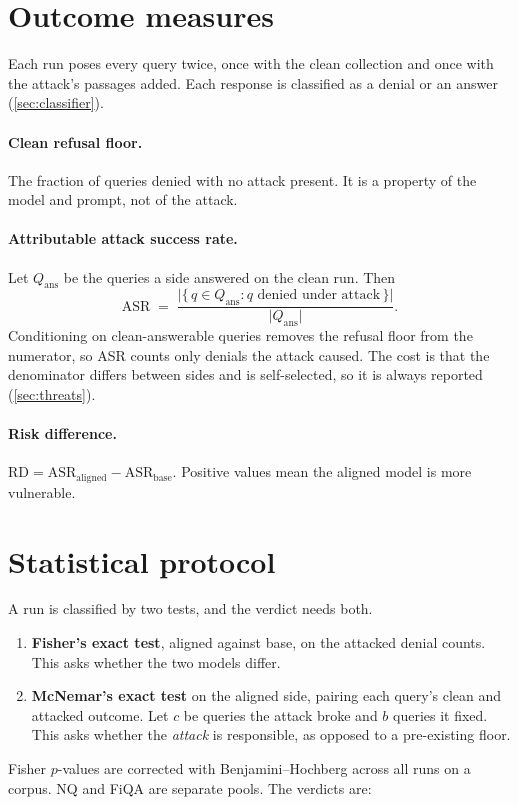 \section{Outcome measures}
\label{sec:metrics}

Each run poses every query twice, once with the clean collection and once with
the attack's passages added. Each response is classified as a denial or an
answer (\cref{sec:classifier}).

\paragraph{Clean refusal floor.} The fraction of queries denied with no attack
present. It is a property of the model and prompt, not of the attack.

\paragraph{Attributable attack success rate.} Let $Q_{\text{ans}}$ be the queries
a side answered on the clean run. Then
\begin{equation}
  \text{ASR} \;=\; \frac{\lvert\{\,q \in Q_{\text{ans}} : q \text{ denied under attack}\,\}\rvert}{\lvert Q_{\text{ans}}\rvert}.
  \label{eq:asr}
\end{equation}
Conditioning on clean-answerable queries removes the refusal floor from the
numerator, so ASR counts only denials the attack caused. The cost is that the
denominator differs between sides and is self-selected, so it is always
reported (\cref{sec:threats}).

\paragraph{Risk difference.} $\text{RD} = \text{ASR}_{\text{aligned}} -
\text{ASR}_{\text{base}}$. Positive values mean the aligned model is more
vulnerable.

\section{Statistical protocol}
\label{sec:stats}

A run is classified by two tests, and the verdict needs both.
\begin{enumerate}
  \item \textbf{Fisher's exact test}, aligned against base, on the attacked denial
    counts. This asks whether the two models differ.
  \item \textbf{McNemar's exact test} \cite{mcnemar1947} on the aligned side,
    pairing each query's clean and attacked outcome. Let $c$ be queries the
    attack broke and $b$ queries it fixed. This asks whether the
    \emph{attack} is responsible, as opposed to a pre-existing floor.
\end{enumerate}
Fisher $p$-values are corrected with Benjamini--Hochberg
\cite{benjamini1995fdr} across all runs on a corpus. NQ and FiQA are separate
pools. The verdicts are:

